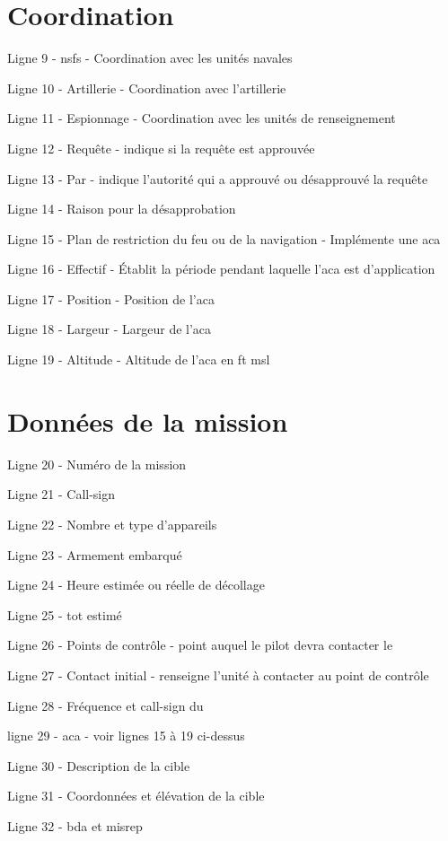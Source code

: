 \begin{e2}
\section{Coordination}

	\item Ligne 9 - \gls{nsfs} - Coordination avec les unités navales
	\item Ligne 10 - Artillerie - Coordination avec l'artillerie
	\item Ligne 11 - Espionnage - Coordination avec les unités de renseignement
	\item Ligne 12 - Requête -  indique si la requête est approuvée
	\item Ligne 13 - Par - indique l'autorité qui a approuvé ou désapprouvé la requête
	\item Ligne 14 - Raison pour la désapprobation
	\item Ligne 15 - Plan de restriction du feu ou de la navigation - Implémente une \gls{aca}
	\item Ligne 16 - Effectif - Établit la période pendant laquelle l'\gls{aca} est d'application
	\item Ligne 17 - Position - Position de l'\gls{aca}
	\item Ligne 18 - Largeur - Largeur de l'\gls{aca}
	\item Ligne 19 - Altitude - Altitude de l'\gls{aca} en \gls{ft} \gls{msl}
	
\section{Données de la mission}

	\item Ligne 20 - Numéro de la mission
	\item Ligne 21 - Call-sign
	\item Ligne 22 - Nombre et type d'appareils
	\item Ligne 23 - Armement embarqué
	\item Ligne 24 - Heure estimée ou réelle de décollage
	\item Ligne 25 - \gls{tot} estimé
	\item Ligne 26 - Points de contrôle - point auquel le pilot devra contacter le \ja{}
	\item Ligne 27 - Contact initial - renseigne l'unité à contacter au point de contrôle
	\item Ligne 28 - Fréquence et call-sign du \ja{}
	\item ligne 29 - \gls{aca} - voir lignes 15 à 19 ci-dessus
	\item Ligne 30 - Description de la cible
	\item Ligne 31 - Coordonnées et élévation de la cible
	\item Ligne 32 - \gls{bda} et \gls{misrep}
\end{e2}

\newpage

\fancyhf{}
\renewcommand{\headrulewidth}{0pt}%
\renewcommand{\footrulewidth}{0pt}%

